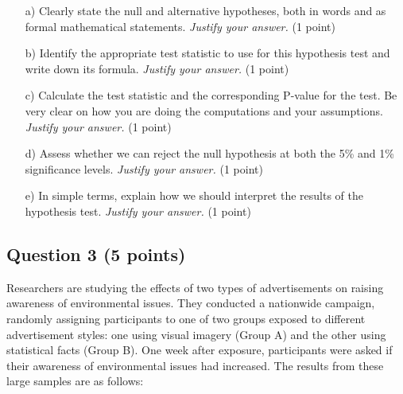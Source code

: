 \documentclass{article}
\begin{document}
\begin{enumerate}
\item[a)] Clearly state the null and alternative hypotheses, both in words and as formal mathematical statements. \emph{Justify your answer.} (1 point)
\begin{center}
\end{center}

\item[b)] Identify the appropriate test statistic to use for this hypothesis test and write down its formula. \emph{Justify your answer.} (1 point)
\begin{center}
\end{center}

\item[c)] Calculate the test statistic and the corresponding P-value for the test. Be very clear on how you are doing the computations and your assumptions. \emph{Justify your answer.} (1 point)
\begin{center}
\end{center}

\item[d)] Assess whether we can reject the null hypothesis at both the 5\% and 1\% significance levels. \emph{Justify your answer.} (1 point)
\begin{center}
\end{center}

\item[e)] In simple terms, explain how we should interpret the results of the hypothesis test. \emph{Justify your answer.} (1 point)
\begin{center}
\end{center}
\end{enumerate}

\newpage
\subsection*{Question 3 (5 points)}
Researchers are studying the effects of two types of advertisements on raising awareness of environmental issues. They conducted a nationwide campaign, randomly assigning participants to one of two groups exposed to different advertisement styles: one using visual imagery (Group A) and the other using statistical facts (Group B). One week after exposure, participants were asked if their awareness of environmental issues had increased. The results from these large samples are as follows:
\end{document}
